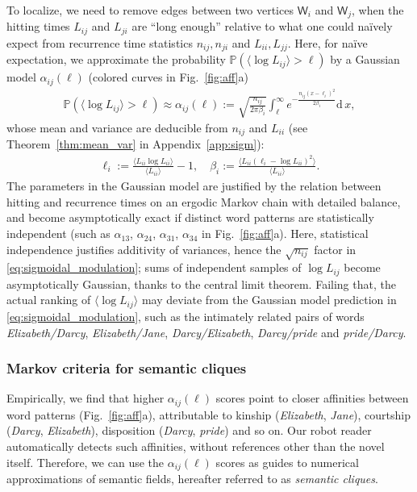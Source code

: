 \documentclass[10pt,journal,compsoc]{IEEEtran}
\begin{document}
To localize, we need to remove edges between two vertices   $ \mathsf W_i$ and $ \mathsf W_j$,
when the hitting times  $  L_{ij}$ and $  L_{ji}$  are ``long enough'' relative to what one could na\"ively expect from recurrence time statistics $n_{ij},{n_{ji}}$ and $L_{ii}, L_{jj}$.
 Here, for na\"ive expectation, we approximate the probability $\mathbb P (\langle \log L_{ij}\rangle>\ell)$ by a Gaussian model $ \alpha_{ij}(\ell)$ (colored curves in Fig.~\ref{fig:aff}a) \begin{align}\mathbb P (\langle \log L_{ij}\rangle>\ell)\approx \alpha_{ij}(\ell):=\sqrt{\frac{n_{ij}}{{2\pi\beta_{i}}}}\int_{\ell}^\infty e^{-\frac{n_{ij}(x-\ell_i)^2}{2\beta_{i}}}\mathrm{d}\, x,\label{eq:sigmoidal_modulation}\end{align}whose mean and variance  are deducible from $ n_{ij}$ and $ L_{ii}$ (see Theorem~\ref{thm:mean_var} in Appendix~\ref{app:sigm}):\begin{align}\ell_i:=\frac{\langle L_{ii}\log  L_{ii}\rangle}{\langle L_{ii}\rangle}-1,\quad \beta_{i}:=\frac{\langle L_{ii}(\ell_i-\log  L_{ii})^2\rangle}{\langle L_{ii}\rangle}.\label{eq:sigmoid_para}\end{align}
The parameters in the Gaussian model are justified by the relation between hitting and recurrence times  \cite{HaydnLacroixVaienti2005} on  an ergodic  Markov chain with detailed balance, and become asymptotically exact if   distinct word patterns are statistically independent (such as $ \alpha_{13}$, $ \alpha_{24}$, $ \alpha_{31}$, $ \alpha_{34}$ in Fig.~\ref{fig:aff}a). Here, statistical independence justifies additivity of variances, hence the $ \sqrt{n_{ij}}$ factor in \eqref{eq:sigmoidal_modulation}; sums of independent samples of $ \log L_{ij}$ become asymptotically Gaussian, thanks to the central limit theorem. Failing that, the actual ranking of $ \langle \log L_{ij}\rangle$ may deviate from the Gaussian model prediction in \eqref{eq:sigmoidal_modulation}, such as the intimately related pairs of words \textit{Elizabeth/Darcy}, \textit{Elizabeth/Jane}, \textit{Darcy/Elizabeth}, \textit{Darcy/pride} and \textit{pride/Darcy}.

\subsubsection{Markov criteria for semantic cliques}
Empirically, we find  that  higher  $ \alpha_{ij}(\ell)$   scores point to closer  affinities between word patterns (Fig.~\ref{fig:aff}a), attributable to kinship (\textit{Elizabeth}, \textit{Jane}), courtship (\textit{Darcy}, \textit{Elizabeth}), disposition (\textit{Darcy}, \textit{pride}) and so on. Our robot reader automatically detects such affinities,   without    references other than the novel itself. Therefore, we can use the  $ \alpha_{ij}(\ell)$ scores as guides to  numerical approximations of  semantic fields, hereafter referred to as \textit{semantic cliques}.
\end{document}
